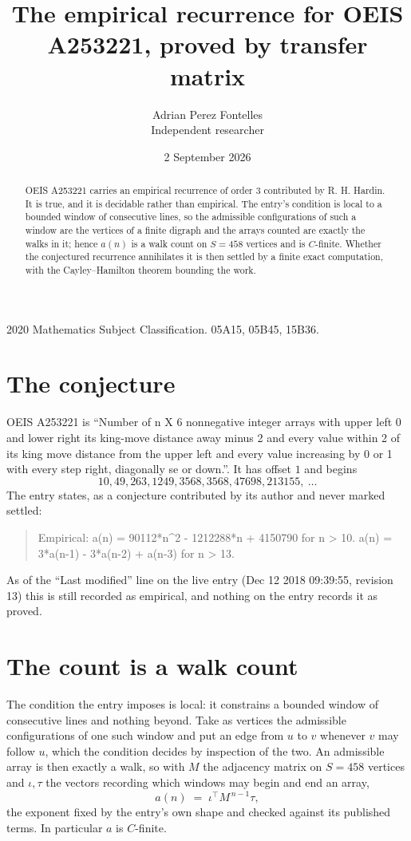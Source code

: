 \documentclass[11pt,a4paper]{article}
\title{The empirical recurrence for OEIS A253221, proved by transfer matrix}
\author{Adrian Perez Fontelles\\ \small Independent researcher}
\date{2 September 2026}
\theoremstyle{plain}
\theoremstyle{definition}
\begin{document}
\maketitle

\begin{abstract}
OEIS A253221 carries an empirical recurrence of order $3$ contributed by R. H. Hardin. It is
true, and it is decidable rather than empirical. The entry's condition is local to a bounded window of consecutive lines, so
the admissible configurations of such a window are the vertices of a finite digraph and the
arrays counted are exactly the walks in it; hence $a(n)$ is a walk count on $S=458$ vertices
and is $C$-finite. Whether the conjectured recurrence annihilates it is then settled by a
finite exact computation, with the Cayley--Hamilton theorem bounding the work.
\end{abstract}

\noindent\small 2020 Mathematics Subject Classification. 05A15, 05B45, 15B36.\normalsize

\section{The conjecture}

OEIS A253221 is ``Number of n X 6 nonnegative integer arrays with upper left 0 and lower right its king-move distance away minus 2 and every value within 2 of its king move distance from the upper left and every value increasing by 0 or 1 with every step right, diagonally se or down.''. It has offset $1$ and begins
\[
10, 49, 263, 1249, 3568, 3568, 47698, 213155,\ \dots
\]
The entry states, as a conjecture contributed by its author and never marked settled:
\begin{quote}
Empirical: a(n) = 90112*n\^{}2 - 1212288*n + 4150790 for n > 10. a(n) = 3*a(n-1) - 3*a(n-2) + a(n-3) for n > 13.
\end{quote}
As of the ``Last modified'' line on the live entry (Dec 12 2018 09:39:55, revision 13) this is still
recorded as empirical, and nothing on the entry records it as proved.

\section{The count is a walk count}

The condition the entry imposes is local: it constrains a bounded window of consecutive lines and nothing beyond. Take as
vertices the admissible configurations of one such window and put an edge from $u$ to $v$
whenever $v$ may follow $u$, which the condition decides by inspection of the two. An
admissible array is then exactly a walk, so with $M$ the adjacency matrix on $S=458$ vertices
and $\iota,\tau$ the vectors recording which windows may begin and end an array,
\[
a(n)\;=\;\iota^{\!\top}M^{\,n-1}\tau ,
\]
the exponent fixed by the entry's own shape and checked against its published terms. In
particular $a$ is $C$-finite.
\end{document}
